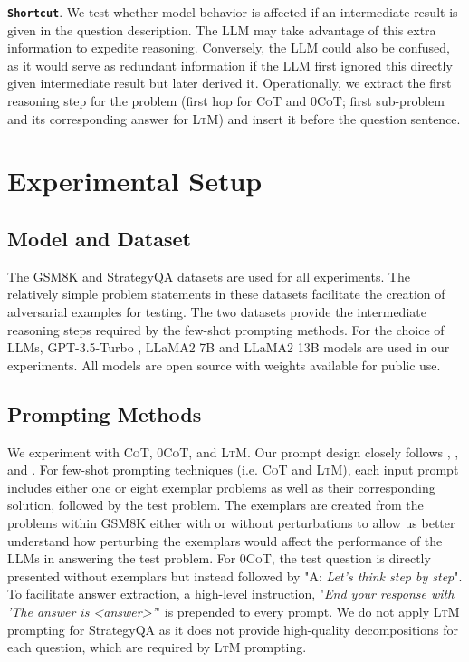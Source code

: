 \documentclass[11pt]{article}
\begin{document}
\noindent \textbf{\texttt{Shortcut}}. We test whether model behavior is affected if an intermediate result is given in the question description. The LLM may take advantage of this extra information to expedite reasoning. Conversely, the LLM could also be confused, as it would serve as redundant information if the LLM first ignored this directly given intermediate result but later derived it. Operationally, we extract the first reasoning step for the problem (first hop for \textsc{CoT} and \textsc{0CoT}; first sub-problem and its corresponding answer for \textsc{LtM}) and insert it before the question sentence.

\section{Experimental Setup}

\subsection{Model and Dataset}

The GSM8K \cite{cobbe2021training} and StrategyQA \cite{geva-etal-2021-aristotle} datasets are used for all experiments. The relatively simple problem statements in these datasets facilitate the creation of adversarial examples for testing. The two datasets provide the intermediate reasoning steps required by the few-shot prompting methods. For the choice of LLMs, GPT-3.5-Turbo \cite{DBLP:journals/corr/abs-2005-14165}, LLaMA2 7B and LLaMA2 13B models are used in our experiments. All models are open source with weights available for public use.

\subsection{Prompting Methods}

We experiment with \textsc{CoT}, \textsc{0CoT}, and \textsc{LtM}. Our prompt design closely follows \citet{zhou2023leasttomost}, 
\citet{kojima2023large}, and \citet{shi2023large}. For few-shot prompting techniques (i.e. \textsc{CoT} and \textsc{LtM}), each input prompt includes either one or eight exemplar problems as well as their corresponding solution, followed by the test problem. The exemplars are created from the problems within GSM8K either with or without perturbations to allow us better understand how perturbing the exemplars would affect the performance of the LLMs in answering the test problem. For \textsc{0CoT}, the test question is directly presented without exemplars but instead followed by "A: \textit{Let's think step by step}". To facilitate answer extraction, a high-level instruction, "\textit{End your response with 'The answer is <answer>'}" is prepended to every prompt. We do not apply \textsc{LtM} prompting for StrategyQA as it does not provide high-quality decompositions for each question, which are required by \textsc{LtM} prompting.
\end{document}
